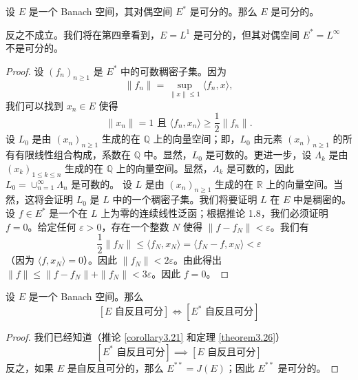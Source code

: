 \begin{theorem}\label{theorem3.26}
设 $E$ 是一个 Banach 空间，其对偶空间 $E^*$ 是可分的。那么 $E$ 是可分的。
\end{theorem}
\begin{remark}
反之不成立。我们将在第四章看到，$E = L^1$ 是可分的，但其对偶空间 $E^* = L^\infty$ 不是可分的。
\end{remark}
\begin{proof}
设 $(f_n)_{n\ge 1}$ 是 $E^*$ 中的可数稠密子集。因为
\[ \|f_n\| = \sup_{\|x\|\le 1} \langle f_n, x \rangle, \]
我们可以找到 $x_n \in E$ 使得
\[ \|x_n\| = 1 \text{ 且 } \langle f_n, x_n \rangle \ge \frac{1}{2} \|f_n\|. \]
设 $L_0$ 是由 $(x_n)_{n\ge 1}$ 生成的在 $\mathbb{Q}$ 上的向量空间；即，$L_0$ 由元素 $(x_n)_{n\ge 1}$ 的所有有限线性组合构成，系数在 $\mathbb{Q}$ 中。显然，$L_0$ 是可数的。更进一步，设 $\Lambda_k$ 是由 $(x_k)_{1\le k\le n}$ 生成的在 $\mathbb{Q}$ 上的向量空间。显然，$\Lambda_k$ 是可数的，因此 $L_0 = \cup_{n=1}^\infty \Lambda_n$ 是可数的。
设 $L$ 是由 $(x_n)_{n\ge 1}$ 生成的在 $\mathbb{R}$ 上的向量空间。当然，这将会证明 $L_0$ 是 $L$ 中的一个稠密子集。我们将要证明 $L$ 在 $E$ 中是稠密的。设 $f \in E^*$ 是一个在 $L$ 上为零的连续线性泛函；根据推论 1.8，我们必须证明 $f=0$。给定任何 $\varepsilon > 0$，存在一个整数 $N$ 使得 $\|f - f_N\| < \varepsilon$。我们有
\[ \frac{1}{2} \|f_N\| \le \langle f_N, x_N \rangle = \langle f_N - f, x_N \rangle < \varepsilon \]
（因为 $\langle f, x_N \rangle = 0$）。因此 $\|f_N\| < 2\varepsilon$。由此得出 $\|f\| \le \|f - f_N\| + \|f_N\| < 3\varepsilon$。因此 $f=0$。
\end{proof}

\begin{corollary}\label{corollary3.27}
设 $E$ 是一个 Banach 空间。那么
\[ [E \text{ 自反且可分}] \iff [E^* \text{ 自反且可分}] \]
\end{corollary}
\begin{proof}
我们已经知道（推论 \ref{corollary3.21} 和定理 \ref{theorem3.26}）
\[ [E^* \text{ 自反且可分}] \implies [E \text{ 自反且可分}] \]
反之，如果 $E$ 是自反且可分的，那么 $E^{**} = J(E)$；因此 $E^{**}$ 是可分的。
\end{proof}

